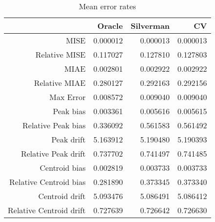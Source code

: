 \begin{table}[ht]
\centering
\begin{tabular}{rrrr}
  \hline
 & Oracle & Silverman & CV \\ 
  \hline
MISE & 0.000012 & 0.000013 & 0.000013 \\ 
  Relative MISE & 0.117027 & 0.127810 & 0.127803 \\ 
  MIAE & 0.002801 & 0.002922 & 0.002922 \\ 
  Relative MIAE & 0.280127 & 0.292163 & 0.292156 \\ 
  Max Error & 0.008572 & 0.009040 & 0.009040 \\ 
  Peak bias & 0.003361 & 0.005616 & 0.005615 \\ 
  Relative Peak bias & 0.336092 & 0.561583 & 0.561492 \\ 
  Peak drift & 5.163912 & 5.190480 & 5.190393 \\ 
  Relative Peak drift & 0.737702 & 0.741497 & 0.741485 \\ 
  Centroid bias & 0.002819 & 0.003733 & 0.003733 \\ 
  Relative Centroid bias & 0.281890 & 0.373345 & 0.373340 \\ 
  Centroid drift & 5.093476 & 5.086491 & 5.086412 \\ 
  Relative Centroid drift & 0.727639 & 0.726642 & 0.726630 \\ 
   \hline
\end{tabular}
\caption{Mean error rates} 
\label{tbl:mean_error_rates}
\end{table}
